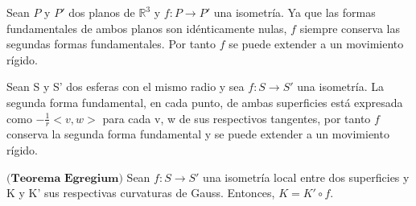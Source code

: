 \begin{ejemplo}
		Sean $P$ y $P'$ dos planos de $\mathbb{R}^3$ y $f : P \to P'$ una isometría. Ya que las formas fundamentales de ambos planos son idénticamente nulas, $f$ siempre conserva las segundas formas fundamentales. Por tanto $f$ se puede extender a un movimiento rígido.
\end{ejemplo}

\begin{ejemplo}
	Sean S y S' dos esferas con el mismo radio y sea $f : S \to S'$ una isometría. La segunda forma fundamental, en cada punto, de ambas superficies está expresada como $-\frac{1}{r}<v,w>$ para cada v, w de sus respectivos tangentes, por tanto $f$ conserva la segunda forma fundamental y se puede extender a un movimiento rígido.
\end{ejemplo}

\begin{teorema}
	$\textbf{(Teorema Egregium)}$ Sean $f : S \to S'$ una isometría local entre dos superficies y K y K' sus respectivas curvaturas de Gauss. Entonces, $K = K'\circ f$.
\end{teorema}


